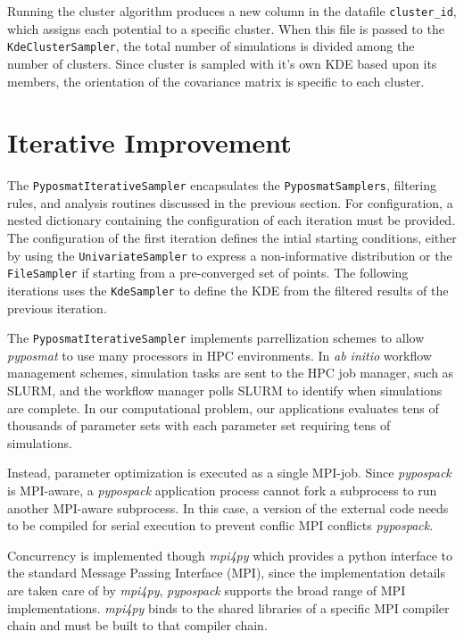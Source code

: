 Running the cluster algorithm produces a new column in the datafile \verb|cluster_id|, which assigns each potential to a specific cluster.  When this file is passed to the \verb|KdeClusterSampler|, the total number of simulations is divided among the number of clusters.  Since cluster is sampled with it's own KDE based upon its members, the orientation of the covariance matrix is specific to each cluster.

\section{Iterative Improvement}
	\label{sec:pypospack_iteration}

The \verb|PyposmatIterativeSampler| encapsulates the \verb|PyposmatSamplers|, filtering rules, and analysis routines discussed in the previous section.  For configuration, a nested dictionary containing the configuration of each iteration must be provided.  The configuration of the first iteration defines the intial starting conditions, either by using the \verb|UnivariateSampler| to express a non-informative distribution or the \verb|FileSampler| if starting from a pre-converged set of points.   The following iterations uses  the \verb|KdeSampler| to define the KDE from the filtered results of the previous iteration.

The \verb|PyposmatIterativeSampler| implements parrellization schemes to allow \emph{pyposmat} to use many processors in HPC environments.  In \emph{ab initio} workflow management schemes, simulation tasks are sent to the HPC job manager, such as SLURM, and the workflow manager polls SLURM to identify when simulations are complete.  In our computational problem, our applications evaluates tens of thousands of parameter sets with each parameter set requiring tens of simulations.

Instead, parameter optimization is executed as a single MPI-job.  Since \emph{pypospack} is MPI-aware, a \emph{pypospack} application process cannot fork a subprocess to run another MPI-aware subprocess.  In this case, a version of the external code needs to be compiled for serial execution to prevent conflic MPI conflicts \emph{pypospack}.

Concurrency is implemented though \emph{mpi4py} which provides a python interface to the standard Message Passing Interface (MPI), since the implementation details are taken care of by \emph{mpi4py}, \emph{pypospack} supports the broad range of MPI implementations.   \emph{mpi4py} binds to the shared libraries of a specific MPI compiler chain and must be built to that compiler chain.

